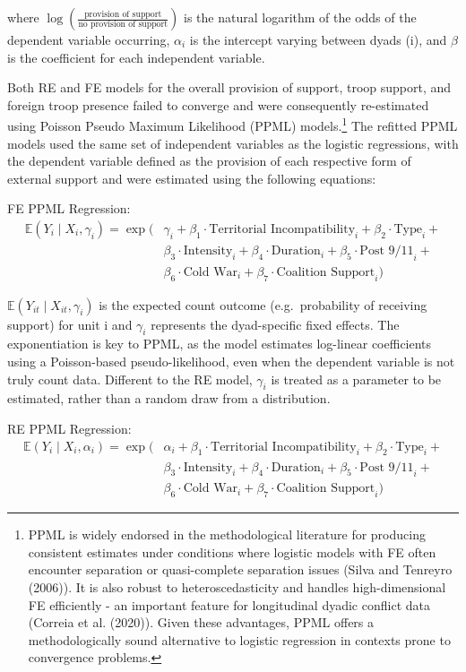 \documentclass[
]{article}
\begin{document}
where
\(\log \left( \frac{\text{provision of support}}{\text{no provision of support}} \right)\)
is the natural logarithm of the odds of the dependent variable
occurring, \(\alpha_i\) is the intercept varying between dyads (i), and
\(\beta\) is the coefficient for each independent variable.

Both RE and FE models for the overall provision of support, troop
support, and foreign troop presence failed to converge and were
consequently re-estimated using Poisson Pseudo Maximum Likelihood (PPML)
models.\footnote{PPML is widely endorsed in the methodological
  literature for producing consistent estimates under conditions where
  logistic models with FE often encounter separation or quasi-complete
  separation issues (Silva and Tenreyro (2006)). It is also robust to
  heteroscedasticity and handles high-dimensional FE efficiently - an
  important feature for longitudinal dyadic conflict data (Correia et
  al. (2020)). Given these advantages, PPML offers a methodologically
  sound alternative to logistic regression in contexts prone to
  convergence problems.} The refitted PPML models used the same set of
independent variables as the logistic regressions, with the dependent
variable defined as the provision of each respective form of external
support and were estimated using the following equations:

FE PPML Regression: \[
\begin{aligned}
\mathbb{E}(Y_{i} \mid X_{i}, \gamma_i) = \exp\bigg(&
\gamma_i + 
\beta_1 \cdot \text{Territorial Incompatibility}_{i} + 
\beta_2 \cdot \text{Type}_{i} + \\
&\beta_3 \cdot \text{Intensity}_{i} + 
\beta_4 \cdot \text{Duration}_{i} + 
\beta_5 \cdot \text{Post 9/11}_{i} + \\
&\beta_6 \cdot \text{Cold War}_{i} + 
\beta_7 \cdot \text{Coalition Support}_{i}
\bigg)
\end{aligned}
\]

\(\mathbb{E}(Y_{it} \mid X_{it}, \gamma_i)\) is the expected count
outcome (e.g.~probability of receiving support) for unit i and
\(\gamma_i\) represents the dyad-specific fixed effects. The
exponentiation is key to PPML, as the model estimates log-linear
coefficients using a Poisson-based pseudo-likelihood, even when the
dependent variable is not truly count data. Different to the RE model,
\(\gamma_i\) is treated as a parameter to be estimated, rather than a
random draw from a distribution.

RE PPML Regression: \[
\begin{aligned}
\mathbb{E}(Y_{i} \mid X_{i}, \alpha_i) = \exp\bigg(&
\alpha_i + 
\beta_1 \cdot \text{Territorial Incompatibility}_{i} + 
\beta_2 \cdot \text{Type}_{i} + \\
&\beta_3 \cdot \text{Intensity}_{i} + 
\beta_4 \cdot \text{Duration}_{i} + 
\beta_5 \cdot \text{Post 9/11}_{i} + \\
&\beta_6 \cdot \text{Cold War}_{i} + 
\beta_7 \cdot \text{Coalition Support}_{i}
\bigg)
\end{aligned}
\]
\end{document}
